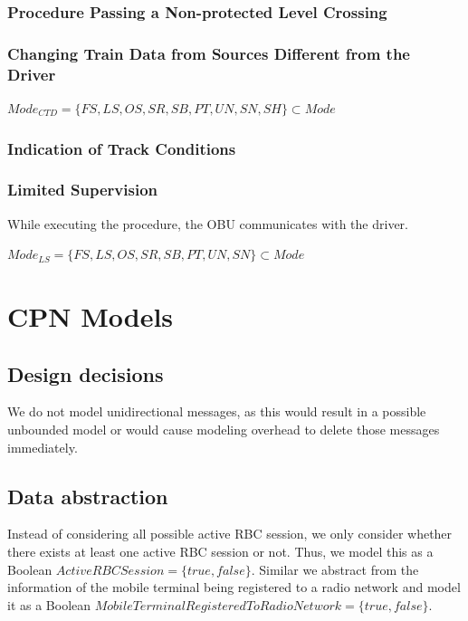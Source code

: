 \documentclass{template/openetcs_article}
\begin{document}
\subsubsection{Procedure Passing a Non-protected Level Crossing}

\subsubsection{Changing Train Data from Sources Different from the Driver}

$\mathit{Mode}_{\mathit{CTD}} = \{FS, LS, OS, SR, SB, PT, UN, SN, SH\} \subset\mathit{Mode}$

\subsubsection{Indication of Track Conditions}

\subsubsection{Limited Supervision}

While executing the procedure, the OBU communicates with the driver.

$\mathit{Mode}_{\mathit{LS}} = \{FS, LS, OS, SR, SB, PT, UN, SN\} \subset\mathit{Mode}$


\section{CPN Models}\label{s:CPNmodels}

\subsection{Design decisions}

We do not model unidirectional messages, as this would result in a possible unbounded model or would cause modeling overhead to delete those messages immediately.

\subsection{Data abstraction}

Instead of considering all possible active RBC session, we only consider whether there exists at least one active RBC session or not. Thus, we model this as a Boolean $\mathit{ActiveRBCSession} = \{\mathit{true}, \mathit{false}\}$. Similar we abstract from the information of the mobile terminal being registered to a radio network and model it as a Boolean $\mathit{MobileTerminalRegisteredToRadioNetwork} = \{\mathit{true}, \mathit{false}\}$.
\end{document}
